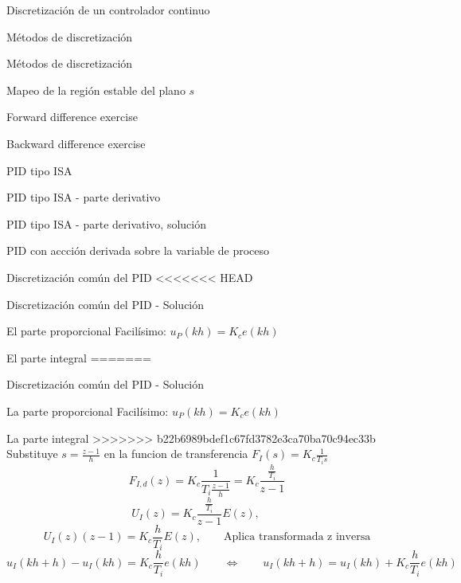 \documentclass[presentation,aspectratio=1610]{beamer}
\begin{document}
\begin{frame}[label={sec:org86d23da}]{Discretización de un controlador continuo}
\begin{frame}[label={sec:org3ca2082}]{Métodos de discretización}
\begin{frame}[label={sec:orga78cff2}]{Métodos de discretización}
\begin{frame}[label={sec:org28bff53}]{Mapeo de la región estable del plano \(s\)}
\begin{frame}[label={sec:org9bb57fa}]{Forward difference exercise}
\begin{frame}[label={sec:orgaf8c1b0}]{Backward difference exercise}
\begin{frame}[label={sec:orgb2215e6}]{PID tipo ISA}
\begin{frame}[label={sec:orga06296a}]{PID tipo ISA - parte derivativo}
\begin{frame}[label={sec:org978e098}]{PID tipo ISA - parte derivativo, solución}
\begin{frame}[label={sec:orgf3b475b}]{PID con accción derivada sobre la variable de proceso}
\begin{frame}[label={sec:org5c3258e}]{Discretización común del PID}
<<<<<<< HEAD
\begin{frame}[label={sec:org95130b5}]{Discretización común del PID - Solución}
\begin{block}{El parte proporcional}
Facilísimo: \(u_P(kh) = K_c e(kh)\)
\end{block}
\begin{block}{El parte integral}
=======
\begin{frame}[label={sec:org90ab64f}]{Discretización común del PID - Solución}
\begin{block}{La parte proporcional}
Facilísimo: \(u_P(kh) = K_c e(kh)\)
\end{block}
\begin{block}{La parte integral}
>>>>>>> b22b6989bdef1c67fd3782e3ca70ba70c94ec33b
Substituye \(s = \frac{z-1}{h}\) en la funcion de transferencia \(F_I(s) = K_c \frac{1}{T_i s}\)
\[ F_{I,d}(z) = K_c\frac{1}{T_i \frac{z-1}{h}} = K_c \frac{\frac{h}{T_i}}{z-1}\]
\[U_I(z) = K_c \frac{\frac{h}{T_i}}{z-1} E(z), \qquad \text{}\]
\[U_I(z)(z-1) = K_c \frac{h}{T_i} E(z), \qquad \text{Aplica transformada z inversa}\]
\[ u_I(kh+h) - u_I(kh) = K_c \frac{h}{T_i} e(kh) \qquad \Leftrightarrow \qquad u_I(kh+h) = u_I(kh) + K_c\frac{h}{T_i} e(kh)\]
\end{block}
\end{frame}


\end{block}
\end{frame}
\end{frame}
\end{frame}
\end{frame}
\end{frame}
\end{frame}
\end{frame}
\end{frame}
\end{frame}
\end{frame}
\end{frame}
\end{frame}
\end{document}
